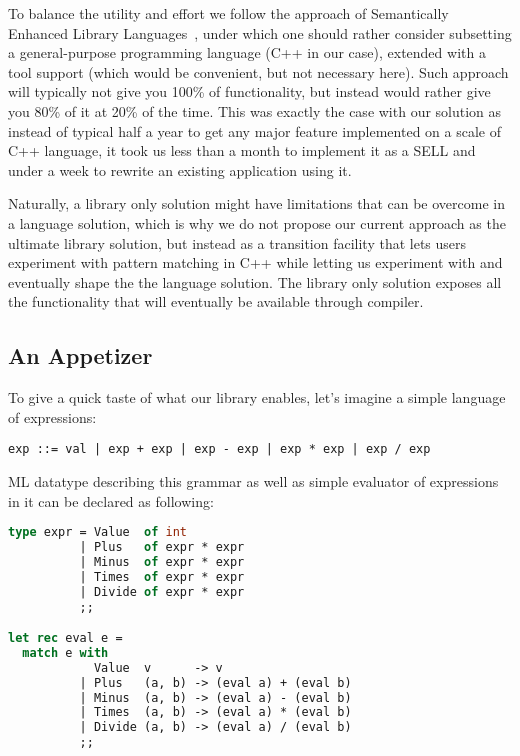 \documentclass[submission,copyright]{eptcs}
\begin{document}
To balance the utility and effort we follow the approach of Semantically 
Enhanced Library Languages~\cite{SELL}, under which one should rather consider 
subsetting a general-purpose programming language (C++ in our case), extended 
with a tool support (which would be convenient, but not necessary here). Such 
approach will typically not give you 100\% of functionality, but instead would 
rather give you 80\% of it at 20\% of the time. This was exactly the case with 
our solution as instead of typical half a year to get any major feature 
implemented on a scale of C++ language, it took us less than a month to 
implement it as a SELL and under a week to rewrite an existing application using 
it.

Naturally, a library only solution might have limitations that can be overcome in 
a language solution, which is why we do not propose our current approach as the 
ultimate library solution, but instead as a transition facility that lets users 
experiment with pattern matching in C++ while letting us experiment with and 
eventually shape the the language solution. The library only solution exposes 
all the functionality that will eventually be available through compiler.

\subsection{An Appetizer}

To give a quick taste of what our library enables, let's imagine a simple 
language of expressions:

\begin{lstlisting}
exp ::= val | exp + exp | exp - exp | exp * exp | exp / exp
\end{lstlisting}

ML datatype describing this grammar as well as simple evaluator of expressions 
in it can be declared as following:

\begin{lstlisting}[language=ML,keepspaces,columns=flexible]
type expr = Value  of int
          | Plus   of expr * expr
          | Minus  of expr * expr
          | Times  of expr * expr
          | Divide of expr * expr
          ;;

let rec eval e =
  match e with
            Value  v      -> v
          | Plus   (a, b) -> (eval a) + (eval b)
          | Minus  (a, b) -> (eval a) - (eval b)
          | Times  (a, b) -> (eval a) * (eval b)
          | Divide (a, b) -> (eval a) / (eval b)
          ;;
\end{lstlisting}
\end{document}
